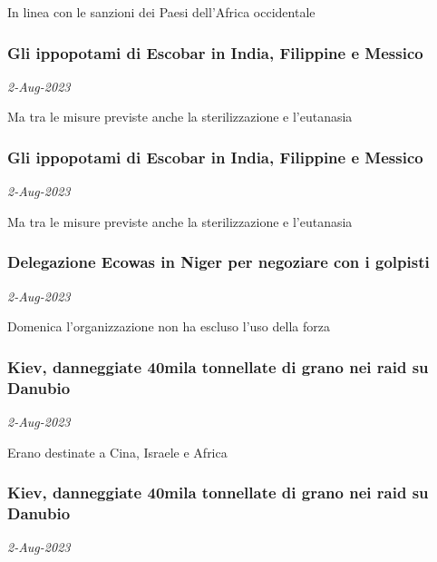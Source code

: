 In linea con le sanzioni dei Paesi dell'Africa occidentale
\subsubsection{Gli ippopotami di Escobar in India, Filippine e Messico \href{https://www.ansa.it/sito/notizie/mondo/americalatina/2023/08/02/gli-ippopotami-di-escobar-in-india-filippine-e-messico_d25e32aa-7bdf-48ad-aa46-d5bce735b18a.html}{}}
\textit{2-Aug-2023}

Ma tra le misure previste anche la sterilizzazione e l'eutanasia
\subsubsection{Gli ippopotami di Escobar in India, Filippine e Messico \href{https://www.ansa.it/sito/notizie/mondo/2023/08/02/gli-ippopotami-di-escobar-in-india-filippine-e-messico_69d885a6-3df0-45d4-80d6-6a2ccea48282.html}{}}
\textit{2-Aug-2023}

Ma tra le misure previste anche la sterilizzazione e l'eutanasia
\subsubsection{Delegazione Ecowas in Niger per negoziare con i golpisti \href{https://www.ansa.it/sito/notizie/mondo/africa/2023/08/02/delegazione-ecowas-in-niger-per-negoziare-con-i-golpisti_3e0d43c4-875e-4868-9431-a7bca9350fb1.html}{}}
\textit{2-Aug-2023}

Domenica l'organizzazione non ha escluso l'uso della forza
\subsubsection{Kiev, danneggiate 40mila tonnellate di grano nei raid su Danubio \href{https://www.ansa.it/sito/notizie/mondo/asia/2023/08/02/kiev-danneggiate-40mila-tonnellate-di-grano-nei-raid-su-danubio_fc316c5d-9417-43a9-88bd-452d1fd60beb.html}{}}
\textit{2-Aug-2023}

Erano destinate a Cina, Israele e Africa
\subsubsection{Kiev, danneggiate 40mila tonnellate di grano nei raid su Danubio \href{https://www.ansa.it/sito/notizie/mondo/africa/2023/08/02/kiev-danneggiate-40mila-tonnellate-di-grano-nei-raid-su-danubio_8776ad77-1c54-4bef-b586-cb1022de8755.html}{}}
\textit{2-Aug-2023}

